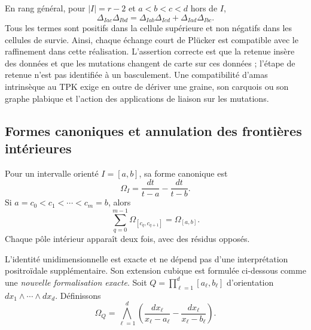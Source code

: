En rang général, pour \(|I|=r-2\) et \(a<b<c<d\) hors de \(I\),
\begin{equation}
 \Delta_{Iac}\Delta_{Ibd}
 =\Delta_{Iab}\Delta_{Icd}+\Delta_{Iad}\Delta_{Ibc}.
 \label{geometria_positiva:eq:short-plucker-tpk}
\end{equation}
Tous les termes sont positifs dans la cellule supérieure et non négatifs dans les cellules de survie. Ainsi, chaque échange court de Plücker est compatible avec le raffinement dans cette réalisation. L’assertion correcte est que la retenue insère des données et que les mutations changent de carte sur ces données ; l’étape de retenue n’est pas identifiée à un basculement. Une compatibilité d’amas intrinsèque au TPK exige en outre de dériver une graine, son carquois ou son graphe plabique et l’action des applications de liaison sur les mutations.

\subsection{Formes canoniques et annulation des frontières intérieures}

Pour un intervalle orienté \(I=[a,b]\), sa forme canonique est
\begin{equation}
 \Omega_I=\frac{dt}{t-a}-\frac{dt}{t-b}.
 \label{geometria_positiva:eq:interval-canonical-form}
\end{equation}
Si \(a=c_0<c_1<\cdots<c_m=b\), alors
\begin{equation}
 \sum_{q=0}^{m-1}\Omega_{[c_q,c_{q+1}]}=\Omega_{[a,b]}.
 \label{geometria_positiva:eq:interval-telescopy}
\end{equation}
Chaque pôle intérieur apparaît deux fois, avec des résidus opposés.

L’identité unidimensionnelle est exacte et ne dépend pas d’une interprétation positroïdale supplémentaire. Son extension cubique est formulée ci-dessous comme une \emph{nouvelle formalisation exacte}. Soit \(Q=\prod_{\ell=1}^d[a_\ell,b_\ell]\) d’orientation \(dx_1\wedge\cdots\wedge dx_d\). Définissons
\begin{equation}
 \Omega_Q=\bigwedge_{\ell=1}^d
 \left(\frac{dx_\ell}{x_\ell-a_\ell}
       -\frac{dx_\ell}{x_\ell-b_\ell}\right).
 \label{geometria_positiva:eq:box-canonical-form}
\end{equation}

